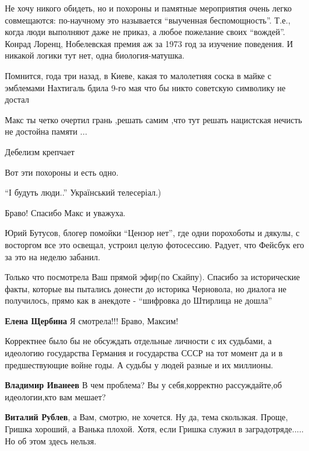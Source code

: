 \begin{itemize}
\begin{itemize}
Не хочу никого обидеть, но и похороны и памятные мероприятия очень легко
совмещаются: по-научному это называется \enquote{выученная беспомощность}. Т.е., когда
люди выполняют даже не приказ, а любое пожелание своих \enquote{вождей}. Конрад
Лоренц, Нобелевская премия аж за 1973 год за изучение поведения. И никакой
логики тут нет, одна биология-матушка.


Помнится, года три назад, в Киеве, какая то малолетняя соска в майке с
эмблемами Нахтигаль бдила 9-го мая что бы никто советскую символику не достал
🤦

Макс ты четко очертил грань ,решать самим ,что тут решать нацистская нечисть не достойна памяти ...

Дебелизм крепчает

Вот эти похороны и есть одно.

\enquote{І будуть люди..} Український телесеріал.)

Браво! Спасибо Макс и уважуха.


Юрий Бутусов, блогер помойки \enquote{Цензор нет}, где одни порохоботы и дякулы, с
восторгом все это освещал, устроил целую фотосессию. Радует, что Фейсбук его за
это на неделю забанил.


Только что посмотрела Ваш прямой эфир(по Скайпу). Спасибо за исторические
факты, которые вы пытались донести до историка Черновола, но диалога не
получилось, прямо как в анекдоте - \enquote{шифровка до Штирлица не дошла}


\textbf{Елена Щербина} Я смотрела!!! Браво, Максим!


Корректнее было бы не обсуждать отдельные личности с их судьбами, а идеологию
государства Германия и государства СССР на тот момент да и в предшествующие
войне годы. А судьбы у людей разные и их миллионы.

\begin{itemize}
\textbf{Владимир Иванеев} В чем проблема? Вы у себя,корректно рассуждайте,об идеологии,кто вам мешает?

\textbf{Виталий Рублев}, а Вам, смотрю, не хочется. Ну да, тема скользкая.
Проще, Гришка хороший, а Ванька плохой. Хотя, если Гришка служил в
заградотряде..... Но об этом здесь нельзя.


\end{itemize}
\end{itemize}
\end{itemize}
